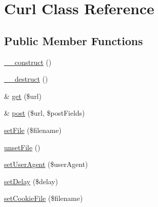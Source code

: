 \hypertarget{classCurl}{\section{Curl Class Reference}
\label{d0/d69/classCurl}
}
\subsection*{Public Member Functions}
\begin{DoxyCompactItemize}
\item 
\hyperlink{classCurl_ac30061cf7f7e57cfb11aa11409114465}{\-\_\-\-\_\-construct} ()
\item 
\hyperlink{classCurl_a5c443123373e790375e93fafd3fd2315}{\-\_\-\-\_\-destruct} ()
\item 
\& \hyperlink{classCurl_a4cf1fc50eaccd809cbe5511f69f90cf7}{get} (\$url)
\item 
\& \hyperlink{classCurl_a7985c5b7c9173025b247a7003e112435}{post} (\$url, \$post\-Fields)
\item 
\hyperlink{classCurl_aa2304a4778e3958d7c8b536e263c9276}{set\-File} (\$filename)
\item 
\hyperlink{classCurl_a6f680bcf43ffabd48712881d2bacb96f}{unset\-File} ()
\item 
\hyperlink{classCurl_a225d35cc78861cb84d4c82417f40e4f6}{set\-User\-Agent} (\$user\-Agent)
\item 
\hyperlink{classCurl_ab8c0bfd69d02a4f6acde02c45a1d8ff5}{set\-Delay} (\$delay)
\item 
\hyperlink{classCurl_a2f96c05ff328186889a77ec9a240ace5}{set\-Cookie\-File} (\$filename)
\end{DoxyCompactItemize}
